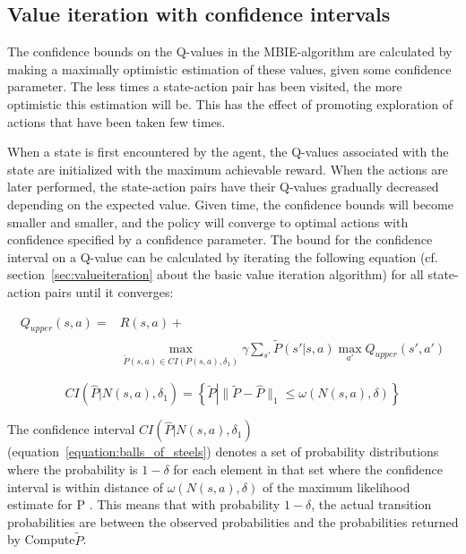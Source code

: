 \subsection{Value iteration with confidence intervals}
\label{sec:modification_conf_interval}

The confidence  bounds on the Q-values in the MBIE-algorithm are calculated by
making a maximally optimistic estimation of these values, given some confidence
parameter. The less times a state-action pair has been visited, the more
optimistic this estimation will be. This has the effect of promoting
exploration of actions that have been taken few times. 

When a state is first encountered by the agent, the Q-values associated with
the state are initialized with the maximum achievable reward. When the actions
are later performed, the state-action pairs have their Q-values gradually
decreased depending on the expected value. Given time, the confidence bounds will
become smaller and smaller, and the policy will converge to optimal actions
with confidence specified by a confidence parameter. The bound for the
confidence interval on a Q-value can be calculated by iterating the following
equation (cf. section~\ref{sec:valueiteration} about the basic value iteration
algorithm) for all state-action pairs until it converges:

\begin{align}
\label{equation:q_upper}
Q_{upper} (s, a) = & R(s, a) + \nonumber \\
& \operatorname*{max}_{\tilde{P}(s, a)\in CI(P(s, a), \delta_1)} \gamma \sum_{s'} \tilde{P}(s'|s, a)\operatorname*{max}_{a'} Q_{upper}(s', a')
\end{align}

\begin{equation}
\label{equation:balls_of_steels}
CI\left(\hat{P} \left| N(s, a), \delta_1\right.\right)  = \left\{\tilde{P} \left| \|\tilde{P} - \hat{P}\|_1 \le \omega(N(s,a), \delta)\right.\right\}
\end{equation}

The confidence interval $CI(\hat{P} | N(s, a), \delta_1)$
(equation~\eqref{equation:balls_of_steels}) denotes a set of probability
distributions where the probability is $1 - \delta$ for each element in that
set where the confidence interval is within distance of $\omega(N(s,a),\delta)$
of the maximum likelihood estimate for P \parencite{dietterich2013pac}. This
means that with probability $1-\delta$, the actual transition probabilities are
between the observed probabilities and the probabilities returned by
Compute$\tilde{P}$.


